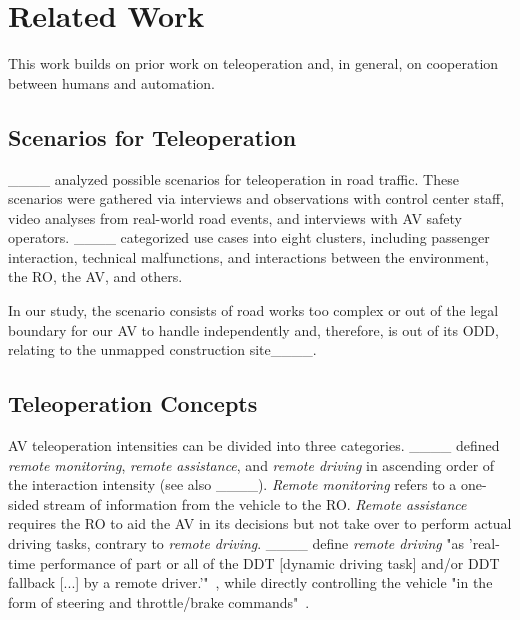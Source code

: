 \section{Related Work}
This work builds on prior work on teleoperation and, in general, on cooperation between humans and automation.

\subsection{Scenarios for Teleoperation}
____ analyzed possible scenarios for teleoperation in road traffic. These scenarios were gathered via interviews and observations with control center staff, video analyses from real-world road events, and interviews with AV safety operators. ____ categorized use cases into eight clusters, including passenger interaction, technical malfunctions, and interactions between the environment, the RO, the AV, and others. 

In our study, the scenario consists of road works too complex or out of the legal boundary for our AV to handle independently and, therefore, is out of its ODD, relating to the unmapped construction site____. %


\subsection{Teleoperation Concepts}
\label{ssec:conceptsofteleop}
AV teleoperation intensities can be divided into three categories. ____ defined %
\textit{remote monitoring}, \textit{remote assistance}, and \textit{remote driving} in ascending order of the interaction intensity (see also ____). \textit{Remote monitoring} refers to a one-sided stream of information from the vehicle to the RO. \textit{Remote assistance} requires the RO to aid the AV in its decisions but not take over to perform actual driving tasks, contrary to \textit{remote driving}. ____ define \textit{remote driving} "as 'real-time performance of part or all of the DDT [dynamic driving task] and/or DDT fallback [...] by a remote driver.'"~\cite[p. 2]{bogdoll_taxonomy_2022}, while directly controlling the vehicle "in the form of steering and throttle/brake commands"~\cite[p. 10]{bogdoll_taxonomy_2022}.

